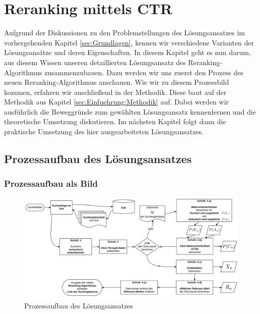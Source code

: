 %
\chapter{Reranking mittels CTR}
\label{sec:Reranking}

Aufgrund der Diskussionen zu den Problemstellungen des Lösungsansatzes im vorhergehenden Kapitel \ref{sec:Grundlagen}, kennen wir verschiedene Varianten der Lösungsansätze und deren Eigenschaften. In diesem Kapitel geht es nun darum, aus diesem Wissen unseren detaillierten Lösungsansatz des Reranking-Algorithmus zusammenzubauen. Dazu werden wir uns zuerst den Prozess des neuen Reranking-Algorithmus anschauen. Wie wir zu diesem Prozessbild kommen, erfahren wir anschließend in der Methodik. Diese baut auf der Methodik aus Kapitel \ref{sec:Einfuehrung:Methodik} auf. Dabei werden wir ausführlich die Beweggründe zum gewählten Lösungsansatz kennenlernen und die theoretische Umsetzung diskutieren. Im nächsten Kapitel folgt dann die praktische Umsetzung des hier ausgearbeiteten Lösungsansatzes.


\section{Prozessaufbau des Lösungsansatzes}
\label{sec:Reranking:Prozessaufbau}

\subsection{Prozessaufbau als Bild}
\label{sec:Reranking:Prozessaufbau:ProzessaufbauBild}

\begin{figure}[H]
\centering
\vspace{-1em}
\caption[Prozessaufbau des Lösungsansatzes]{Prozessaufbau des Lösungsansatzes}
\label{fig:Prozessaufbau}
\includegraphics[width=\linewidth]{gfx/ProzessaufbauBild}
\vspace{-2em}
\end{figure}
		
